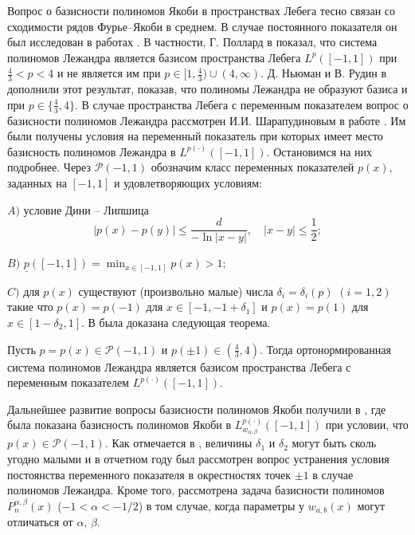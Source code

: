  Вопрос о базисности полиномов Якоби в пространствах Лебега тесно связан со сходимости рядов Фурье--Якоби в среднем. В случае постоянного показателя он был исследован в работах \cite{tad-Pollard-1,tad-Pollard-2,tad-Pollard-3,tad-Newman-Rudin,tad-Muckenhoupt}. В частности, Г. Поллард в  \cite{tad-Pollard-1} показал, что система полиномов Лежандра является базисом пространства Лебега $L^p([-1,1])$ при $\frac43<p<4$ и не является им при $p\in[1,\frac43)\cup(4,\infty)$. Д. Ньюман и В. Рудин в \cite{tad-Newman-Rudin} дополнили этот результат, показав, что полиномы Лежандра не образуют базиса и при $p \in \{\frac43, 4\}$. В случае пространства Лебега с переменным показателем вопрос о базисности полиномов Лежандра рассмотрен И.И. Шарапудиновым в работе \cite{tad-SHII-Leg}. Им были получены условия на переменный показатель при которых имеет место базисность полиномов Лежандра в $L^{p(\cdot)}([-1,1])$. Остановимся на них подробнее. Через $\mathcal{P}(-1,1)$ обозначим класс переменных показателей $p(x)$, заданных на $[-1,1]$ и удовлетворяющих условиям:

$A)$  условие Дини -- Липшица
\begin{equation}\label{tad-DiniLipCond}
  |p(x)-p(y)|\le \frac{d}{-\ln|x-y|}, \quad |x-y|\le\frac12;
\end{equation}

$B)$  $\underline{p}([-1,1])=\min_{x\in [-1,1]}p(x)>1$;

$C)$ для $p(x)$ существуют (произвольно малые) числа $\delta_i=\delta_i(p)$ $(i=1,2)$ такие что $p(x)=p(-1)$ для $x\in[-1,-1+\delta_1]$ и $p(x)=p(1)$ для $x\in [1-\delta_2,1]$.
В \cite{tad-SHII-Leg} была доказана следующая теорема.
\begin{theoremA}\label{ShII-Th}
	Пусть $p=p(x)\in\mathcal{P}(-1,1)$  и $p(\pm1)\in(\frac43,4)$. Тогда ортонормированная система полиномов Лежандра является базисом пространства Лебега с переменным показателем $L^{p(\cdot)}([-1,1])$.
\end{theoremA}
Дальнейшее развитие вопросы  базисности полиномов Якоби получили в \cite{tad-SHII-Jacob,tad-SHII-Ult,tad-RAM-Jacob}, где была показана базисность полиномов Якоби в $L^{p(\cdot)}_{w_{\alpha,\beta}}([-1,1])$ при условии, что $p(x)\in\mathcal{P}(-1,1)$.  Как отмечается в \cite{tad-SHII-Leg}, величины $\delta_1$ и $\delta_2$ могут быть сколь угодно малыми и в отчетном году был рассмотрен вопрос устранения условия постоянства переменного показателя в окрестностях точек $\pm1$ в случае полиномов Лежандра. Кроме того, рассмотрена задача базисности полиномов $P_n^{\alpha,\beta}(x)$ ($-1<\alpha<-1/2$) в том случае, когда параметры у $w_{a,b}(x)$ могут отличаться от $\alpha$, $\beta$.

